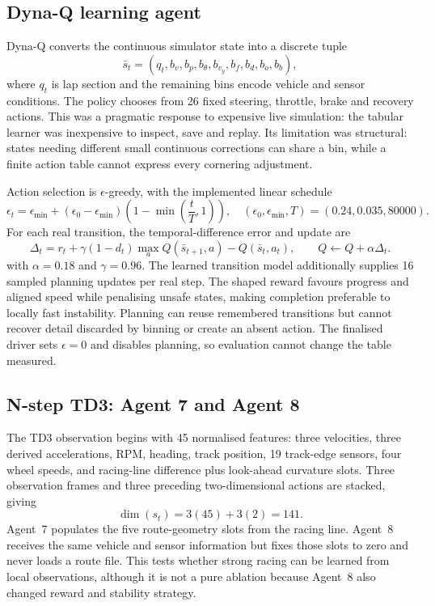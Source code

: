 \subsection{Dyna-Q learning agent}

Dyna-Q converts the continuous simulator state into a discrete tuple
\begin{equation*}
  \bar{s}_t=(q_t,b_v,b_p,b_\theta,b_{v_y},b_f,b_d,b_o,b_b),
\end{equation*}
where $q_t$ is lap section and the remaining bins encode vehicle and sensor conditions. The policy chooses from 26 fixed steering, throttle, brake and recovery actions. This was a pragmatic response to expensive live simulation: the tabular learner was inexpensive to inspect, save and replay. Its limitation was structural: states needing different small continuous corrections can share a bin, while a finite action table cannot express every cornering adjustment.

Action selection is $\epsilon$-greedy, with the implemented linear schedule
\begin{equation*}
  \epsilon_t=\epsilon_{\min}+(\epsilon_0-\epsilon_{\min})
  \left(1-\min\!\left(\frac{t}{T},1\right)\right),
  \quad (\epsilon_0,\epsilon_{\min},T)=(0.24,0.035,80000).
\end{equation*}
For each real transition, the temporal-difference error and update are
\begin{equation*}
  \Delta_t=r_t+\gamma(1-d_t)\max_a Q(\bar{s}_{t+1},a)-Q(\bar{s}_t,a_t),
  \qquad Q\leftarrow Q+\alpha\Delta_t.
\end{equation*}
with $\alpha=0.18$ and $\gamma=0.96$. The learned transition model additionally supplies 16 sampled planning updates per real step. The shaped reward favours progress and aligned speed while penalising unsafe states, making completion preferable to locally fast instability. Planning can reuse remembered transitions but cannot recover detail discarded by binning or create an absent action. The finalised driver sets $\epsilon=0$ and disables planning, so evaluation cannot change the table measured.

\subsection{N-step TD3: Agent 7 and Agent 8}

The TD3 observation begins with 45 normalised features: three velocities, three derived accelerations, RPM, heading, track position, 19 track-edge sensors, four wheel speeds, and racing-line difference plus look-ahead curvature slots. Three observation frames and three preceding two-dimensional actions are stacked, giving
\begin{equation*}
  \dim(s_t)=3(45)+3(2)=141.
\end{equation*}
Agent~7 populates the five route-geometry slots from the racing line. Agent~8 receives the same vehicle and sensor information but fixes those slots to zero and never loads a route file. This tests whether strong racing can be learned from local observations, although it is not a pure ablation because Agent~8 also changed reward and stability strategy.


